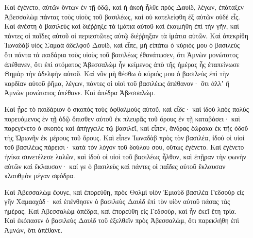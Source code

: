 {\par }{\PP {}Καὶ ἐγένετο, αὐτῶν ὄντων ἐν τῇ ὁδῷ, καὶ ἡ ἀκοὴ ἦλθε πρὸς Δαυὶδ, λέγων, ἐπάταξεν Ἀβεσσαλὼμ πάντας τοὺς υἱοὺς τοῦ βασιλέως, καὶ οὐ κατελείφθη ἐξ αὐτῶν οὐδὲ εἷς.
Καὶ ἀνέστη ὁ βασιλεὺς καὶ διέῤῥηξε τὰ ἱμάτια αὐτοῦ καὶ ἐκοιμήθη ἐπὶ τὴν γῆν, καὶ πάντες οἱ παῖδες αὐτοῦ οἱ περιεστῶτες αὐτῷ διέῤῥηξαν τὰ ἱμάτια αὐτῶν.
Καὶ ἀπεκρίθη Ἰωναδὰβ υἱὸς Σαμαὰ ἀδελφοῦ Δαυὶδ, καὶ εἶπε, μὴ εἰπάτω ὁ κύριός μου ὁ βασιλεὺς ὅτι πάντα τὰ παιδάρια τοὺς υἱοὺς τοῦ βασιλέως ἐθανάτωσεν, ὅτι Ἀμνὼν μονώτατος ἀπέθανεν, ὅτι ἐπὶ στόματος Ἀβεσσαλὼμ ἦν κείμενος ἀπὸ τῆς ἡμέρας ἧς ἐταπείνωσε Θημὰρ τὴν ἀδελφὴν αὐτοῦ.
Καὶ νῦν μὴ θέσθω ὁ κύριός μου ὁ βασιλεὺς ἐπὶ τὴν καρδίαν αὐτοῦ ῥῆμα, λέγων, πάντες οἱ υἱοὶ τοῦ βασιλέως ἀπέθανον· ὅτι ἀλλʼ ἢ Ἀμνὼν μονώτατος ἀπέθανε.
Καὶ ἀπέδρα Ἀβεσσαλώμ.
\par }{\PP Καὶ ᾖρε τὸ παιδάριον ὁ σκοπὸς τοὺς ὀφθαλμοὺς αὐτοῦ, καὶ εἶδε· καὶ ἰδοὺ λαὸς πολὺς πορευόμενος ἐν τῇ ὁδῷ ὄπισθεν αὐτοῦ ἐκ πλευρᾶς τοῦ ὄρους ἐν τῇ καταβάσει· καὶ παρεγένετο ὁ σκοπὸς καὶ ἀπήγγειλε τῷ βασιλεῖ, καὶ εἶπεν, ἄνδρας ἑώρακα ἐκ τῆς ὁδοῦ τὴς Ὠρωνῆν ἐκ μέρους τοῦ ὄρους.
Καὶ εἶπεν Ἰωναδὰβ πρὸς τὸν βασιλέα, ἰδοὺ οἱ υἱοὶ τοῦ βασιλέως πάρεισι· κατὰ τὸν λόγον τοῦ δούλου σου, οὕτως ἐγένετο.
Καὶ ἐγένετο ἡνίκα συνετέλεσε λαλῶν, καὶ ἰδοὺ οἱ υἱοὶ τοῦ βασιλέως ἦλθον, καὶ ἐπῇραν τὴν φωνὴν αὐτῶν καὶ ἔκλαυσαν· καί γε ὁ βασιλεὺς καὶ πάντες οἱ παῖδες αὐτοῦ ἔκλαυσαν κλαυθμὸν μέγαν σφόδρα.
\par }{\PP {}Καὶ Ἀβεσσαλὼμ ἔφυγε, καὶ ἐπορεύθη, πρὸς Θολμὶ υἱὸν Ἐμιοὺδ βασιλέα Γεδσοὺρ εἰς γῆν Χαμααχάδ· καὶ ἐπένθησεν ὁ βασιλεὺς Δαυὶδ ἐπὶ τὸν υἱὸν αὐτοῦ πάσας τὰς ἡμέρας.
Καὶ Ἀβεσσαλὼμ ἀπέδρα, καὶ ἐπορεύθη εἰς Γεδσοὺρ, καὶ ἦν ἐκεῖ ἔτη τρία.
Καὶ ἐκόπασεν ὁ βασιλεὺς Δαυὶδ τοῦ ἐξελθεῖν πρὸς Ἀβεσσαλὼμ, ὅτι παρεκλήθη ἐπὶ Ἀμνὼν, ὅτι ἀπέθανε.

}
